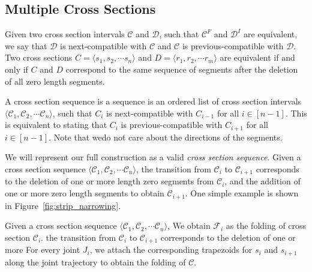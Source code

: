 \subsection{Multiple Cross Sections}
\label{sec:intervals}


\begin{definition}
\label{def:compatible}
Given two cross section intervals $\mathcal C$ and $\mathcal D$, such that $\mathcal C^F$ and $\mathcal D^I$ are equivalent,
we say that $\mathcal D$ is next-compatible with $\mathcal C$ and $\mathcal C$ is previous-compatible with $\mathcal D$.
Two cross sections $C = \langle s_1, s_2,\cdots s_n \rangle$ and $D = \langle r_1, r_2,\cdots r_m \rangle$ are equivalent
if and only if $C$ and $D$ correspond to the same sequence of segments after the deletion of all zero length segments.
\end{definition}

\begin{definition}
\label{def:cross_section_sequence}
A cross section sequence is a sequence is an ordered list of cross section intervals $ \langle \mathcal C_1, \mathcal C_2,\cdots \mathcal C_n \rangle$,
such that $C_{i}$ is next-compatible with $C_{i-1}$ for all $i\in [n-1]$.
This is equivalent to stating that $C_{i}$ is previous-compatible with $C_{i+1}$ for all $i\in [n-1]$.
Note that wedo not care about the directions of the segments.
\end{definition}

We will represent our full construction as a valid \emph{cross section sequence}.
Given a cross section sequence $\langle \mathcal C_1, \mathcal C_2,\cdots \mathcal C_n \rangle$,
the transition from $\mathcal C_i$ to $\mathcal C_{i+1}$ corresponds to the deletion of one or more
length zero segments from $\mathcal C_i$, and the addition of one or more zero length segments to obtain $\mathcal C_{i+1}$.
One simple example is shown in Figure~\ref{fig:strip_narrowing}.

\begin{definition}
\label{def:sequence_folding}
Given a cross section sequence $\langle \mathcal C_1, \mathcal C_2,\cdots \mathcal C_n \rangle$,
We obtain $\mathcal F_i$ as the folding of cross section $\mathcal C_i$.
the transition from $\mathcal C_i$ to $\mathcal C_{i+1}$ corresponds to the deletion of one or more
For every joint $J_i$, we attach the corresponding trapezoids for $s_i$ and $s_{i+1}$
along the joint trajectory to obtain the folding of $\mathcal C$.
\end{definition}

